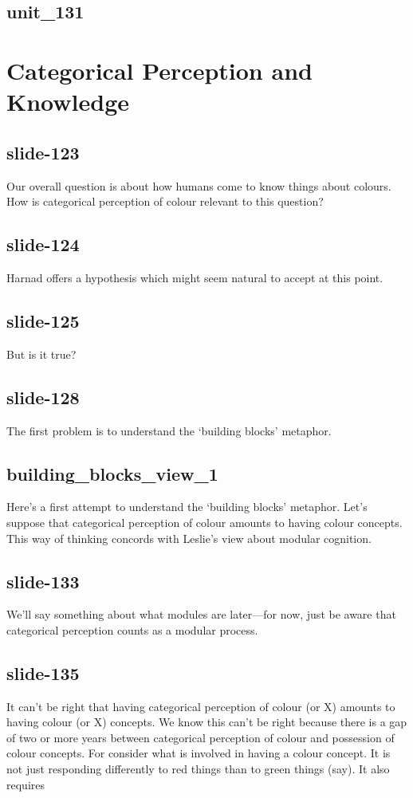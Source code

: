 \documentclass[12pt,\papersize]{extarticle}
\begin{document}
 
\subsection{unit\_131}
 
\section{Categorical Perception and Knowledge}
 
 
\subsection{slide-123}
Our overall question is about how humans come to know things about colours.
How is categorical perception of colour relevant to this question?
 
 
\subsection{slide-124}
Harnad offers a hypothesis which might seem natural to accept at this point.
 
 
\subsection{slide-125}
But is it true?
 
 
\subsection{slide-128}
The first problem is to understand the ‘building blocks’ metaphor.
 
 
\subsection{building\_blocks\_view\_1}
Here's a first attempt to understand the ‘building blocks’ metaphor.
Let's suppose that categorical perception of colour amounts to having colour concepts.
This way of thinking concords with Leslie's view about modular cognition.
 
 
\subsection{slide-133}
We'll say something about what modules are later---for now, just be aware that categorical perception counts as a modular process.
 
 
\subsection{slide-135}
It can't be right that having categorical perception of colour (or X) amounts to having colour (or X) concepts.
We know this can't be right because there is a gap of two or more years between categorical perception of colour and possession of colour concepts.
For consider what is involved in having a colour concept.
It is not just responding differently to red things than to green things (say).
It also requires
 
\end{document}
